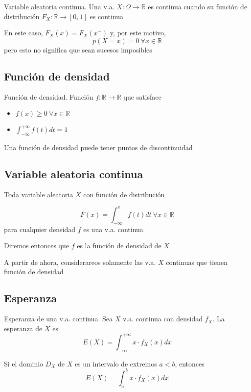\documentclass[
]{article}
\providecommand{\tightlist}{%
  \setlength{\itemsep}{0pt}\setlength{\parskip}{0pt}}
\begin{document}
Variable aleatoria continua. Una v.a.
\(X:\Omega\longrightarrow\mathbb{R}\) es continua cuando su función de
distribución \(F_X:\mathbb{R}\longrightarrow[0,1]\) es continua

En este caso, \(F_X(x)=F_X(x^-)\) y, por este motivo,
\[p(X=x)=0\ \forall x\in\mathbb{R}\] pero esto no significa que sean
sucesos imposibles

\hypertarget{funciuxf3n-de-densidad}{%
\subsection{Función de densidad}\label{funciuxf3n-de-densidad}}

Función de densidad. Función \(f:\mathbb{R}\longrightarrow\mathbb{R}\)
que satisface

\begin{itemize}
\tightlist
\item
  \(f(x)\ge 0\ \forall x\in\mathbb{R}\)
\item
  \(\int_{-\infty}^{+\infty}f(t)dt=1\)
\end{itemize}

Una función de densidad puede tener puntos de discontinuidad

\hypertarget{variable-aleatoria-continua-1}{%
\subsection{Variable aleatoria
continua}\label{variable-aleatoria-continua-1}}

Toda variable aleatoria \(X\) con función de distribución

\[F(x)=\int_{-\infty}^{x}f(t)dt\ \forall x\in\mathbb{R}\] para cualquier
densidad \(f\) es una v.a. continua

Diremos entonces que \(f\) es la función de densidad de \(X\)

A partir de ahora, considerareos solamente las v.a. \(X\) continuas que
tienen función de densidad

\hypertarget{esperanza-1}{%
\subsection{Esperanza}\label{esperanza-1}}

Esperanza de una v.a. continua. Sea \(X\) v.a. continua con densidad
\(f_X\). La esperanza de \(X\) es
\[E(X)=\int_{-\infty}^{+\infty}x\cdot f_X(x)dx\]

Si el dominio \(D_X\) de \(X\) es un intervalo de extremos \(a<b\),
entonces \[E(X)=\int_a^b x\cdot f_X(x)dx\]
\end{document}
